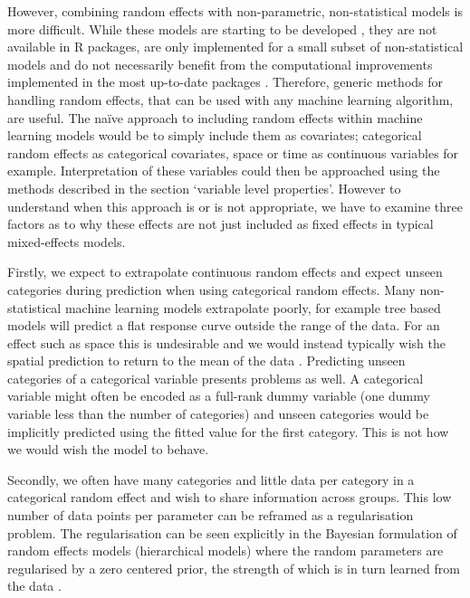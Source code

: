 \documentclass[12pt,]{article}
\begin{document}
However, combining random effects with non-parametric, non-statistical models is more difficult.
While these models are starting to be developed \citep{ngufor2019mixed, hajjem2014mixed, hajjem2017generalized, eo2014tree, miller2017gradient, REEMtree}, they are not available in R packages, are only implemented for a small subset of non-statistical models and do not necessarily benefit from the computational improvements implemented in the most up-to-date packages \citep{wright2015ranger, xgboost}.
Therefore, generic methods for handling random effects, that can be used with any machine learning algorithm, are useful.
The na\"{i}ve approach to including random effects within machine learning models would be to simply include them as covariates; categorical random effects as categorical covariates, space or time as continuous variables for example.
Interpretation of these variables could then be approached using the methods described in the section `variable level properties'.
However to understand when this approach is or is not appropriate, we have to examine three factors as to why these effects are not just included as fixed effects in typical mixed-effects models.

Firstly, we expect to extrapolate continuous random effects and expect unseen categories during prediction when using categorical random effects.
Many non-statistical machine learning models extrapolate poorly, for example tree based models will predict a flat response curve outside the range of the data.
For an effect such as space this is undesirable and we would instead typically wish the spatial prediction to return to the mean of the data \citep{rasmussen2004gaussian, hengl2018random}.
Predicting unseen categories of a categorical variable presents problems as well.
A categorical variable might often be encoded as a full-rank dummy variable (one dummy variable less than the number of categories) and unseen categories would be implicitly predicted using the fitted value for the first category.
This is not how we would wish the model to behave.

Secondly, we often have many categories and little data per category in a categorical random effect and wish to share information across groups.
This low number of data points per parameter can be reframed as a regularisation problem.
The regularisation can be seen explicitly in the Bayesian formulation of random effects models (hierarchical models) where the random parameters are regularised by a zero centered prior, the strength of which is in turn learned from the data \citep{simpson2017penalising}.
\end{document}
